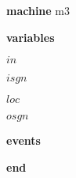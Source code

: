 \begin{block}
  \item   \textbf{machine} m3
  \item   \textbf{variables}
  \begin{block}
    \item   $in$
    \item   $isgn$
    \item   $loc$
    \item   $osgn$
  \end{block}
  \item   
  \item   \textbf{events}
  \begin{block}
    \item   
    \item   
    \item   
    \item   
  \end{block}
  \item   \textbf{end} \\
\end{block}
